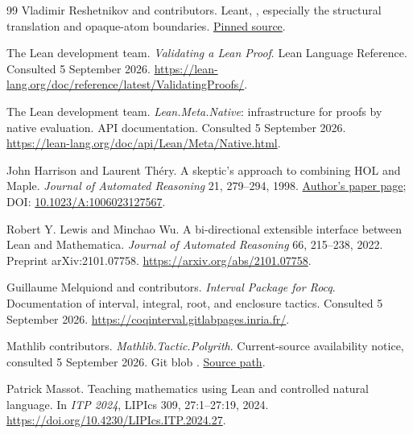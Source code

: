 \documentclass[11pt,a4paper]{article}
\theoremstyle{remark}\newtheorem{example}[proposition]{Example}
\begin{document}
\begin{thebibliography}{99}
Vladimir Reshetnikov and contributors. Leant, , especially the structural translation and opaque-atom boundaries.
\href{https://github.com/VladimirReshetnikov/Leant/blob/3a40904be8a410d832d9ab6900b3d3e7b425eccb/src/Leant/Synth/Fragment.hs}{Pinned source}.

The Lean development team. \emph{Validating a Lean Proof}. Lean Language Reference. Consulted 5 September 2026.
\url{https://lean-lang.org/doc/reference/latest/ValidatingProofs/}.

The Lean development team. \emph{Lean.Meta.Native}: infrastructure for proofs by native evaluation. API documentation. Consulted 5 September 2026.
\url{https://lean-lang.org/doc/api/Lean/Meta/Native.html}.

John Harrison and Laurent Th\'ery. A skeptic's approach to combining HOL and Maple. \emph{Journal of Automated Reasoning} 21, 279--294, 1998.
\href{https://www.cl.cam.ac.uk/~jrh13/papers/cas.html}{Author's paper page}; DOI: \href{https://doi.org/10.1023/A:1006023127567}{10.1023/A:1006023127567}.

Robert Y. Lewis and Minchao Wu. A bi-directional extensible interface between Lean and Mathematica. \emph{Journal of Automated Reasoning} 66, 215--238, 2022. Preprint arXiv:2101.07758.
\url{https://arxiv.org/abs/2101.07758}.

Guillaume Melquiond and contributors. \emph{Interval Package for Rocq}. Documentation of interval, integral, root, and enclosure tactics. Consulted 5 September 2026.
\url{https://coqinterval.gitlabpages.inria.fr/}.

Mathlib contributors. \emph{Mathlib.Tactic.Polyrith}. Current-source availability notice, consulted 5 September 2026. Git blob .
\href{https://github.com/leanprover-community/mathlib4/blob/master/Mathlib/Tactic/Polyrith.lean}{Source path}.

Patrick Massot. Teaching mathematics using Lean and controlled natural language. In \emph{ITP 2024}, LIPIcs 309, 27:1--27:19, 2024.
\url{https://doi.org/10.4230/LIPIcs.ITP.2024.27}.
\end{thebibliography}
\end{document}
